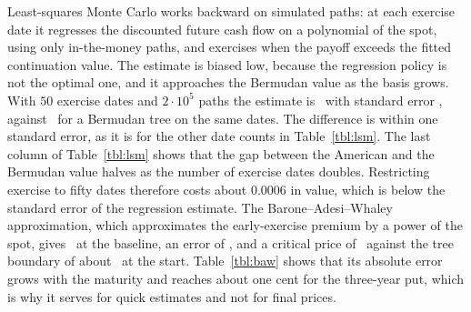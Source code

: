 Least-squares Monte Carlo works backward on simulated paths: at each exercise date it regresses the discounted future cash flow on a polynomial of the spot, using only in-the-money paths, and exercises when the payoff exceeds the fitted continuation value.
The estimate is biased low, because the regression policy is not the optimal one, and it approaches the Bermudan value as the basis grows.
With $50$ exercise dates and $2\cdot10^5$ paths the estimate is \LSMfifty\ with standard error \LSMfiftySE, against \BermFifty\ for a Bermudan tree on the same dates.
The difference is within one standard error, as it is for the other date counts in Table~\ref{tbl:lsm}.
The last column of Table~\ref{tbl:lsm} shows that the gap between the American and the Bermudan value halves as the number of exercise dates doubles.
Restricting exercise to fifty dates therefore costs about $0.0006$ in value, which is below the standard error of the regression estimate.
The Barone--Adesi--Whaley approximation, which approximates the early-exercise premium by a power of the spot, gives \BAWV\ at the baseline, an error of \BAWerr, and a critical price of \BAWSc\ against the tree boundary of about \AmBearly\ at the start.
Table~\ref{tbl:baw} shows that its absolute error grows with the maturity and reaches about one cent for the three-year put, which is why it serves for quick estimates and not for final prices.
